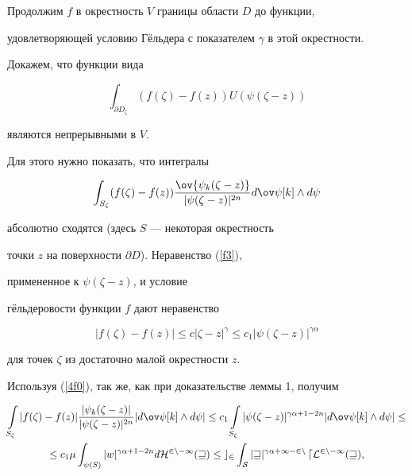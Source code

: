 \begin{pf}


Продолжим $f$ в окрестность $V$ границы области $D$ до функции,


удовлетворяющей условию Г\"ельдера с показателем $\gamma$ в этой окрестности.


Докажем, что функции вида


$$


\int_{\partial D_\zeta}(f(\zeta)-f(z))U(\psi(\zeta-z))


$$


являются непрерывными в $V$.


Для этого нужно показать, что интегралы 


$$


\int_{S_\zeta}(f(\zeta)-f(z))


\frac{\ov{\psi_k(\zeta-z)}}{|\psi(\zeta-z)|^{2n}}d\ov\psi[k]\land d\psi


$$


абсолютно сходятся (здесь $S$ --- некоторая окрестность 


точки $z$ на поверхности $\partial D$). Неравенство (\ref{f3}), 


примененное к $\psi(\zeta-z)$, и условие


г\"ельдеровости функции $f$ дают неравенство


$$


|f(\zeta)-f(z)|\le c|\zeta-z|^\gamma\le c_1|\psi(\zeta-z)|^{\gamma


\alpha}


$$


для точек $\zeta$ из достаточно малой окрестности $z$.


Используя (\ref{4f0}), так же, как при доказательстве леммы 1, получим


\begin{multline*}


\int\limits_{S_\zeta}|f(\zeta)-f(z)|


\frac{|\psi_k(\zeta-z)|}{|\psi(\zeta-z)|^{2n}}


|d\ov\psi[k]\land d\psi|\le


c_1\int\limits_{S_\zeta}|\psi(\zeta-z)|^{\gamma\alpha+1-2n}


|d\ov\psi[k]\land d\psi|\le \\


%


\le c_1\mu \int_{\psi(S)}|w|^{\gamma\alpha+1-2n} d\cal H^{2n-1}(w)\le


c_2\int_{S}|w|^{\gamma\alpha+1-2n} \, d\cal L^{2n-1}(w),



\end{multline*}
\end{pf}
